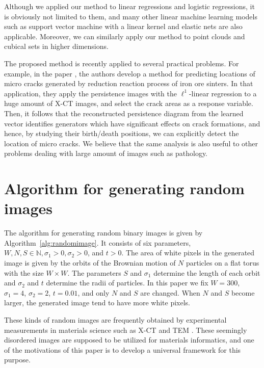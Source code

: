 \documentclass[smallextended]{svjour3}
\begin{document}
Although we applied our method to linear regressions and logistic regressions, it is obviously not limited to them, and many other linear machine learning models such as support vector machine with a linear kernel and elastic nets are also applicable. Moreover, we can similarly apply our method to point clouds and cubical sets in higher dimensions. 




The proposed method is recently applied to several practical problems. For example, in the paper \citep{iron}, the authors develop  a method for predicting locations of micro cracks generated by reduction reaction process of iron ore sinters. In that application, they apply the persistence images with the $\ell^1$-linear regression to a huge amount of X-CT images, and select the crack areas as a response variable. Then, it follows that the reconstructed persistence diagram from the learned vector identifies  generators which have significant effects on crack formations, and hence, by studying their birth/death positions, we can explicitly detect the location of micro cracks. We believe that the same analysis is also useful to other problems dealing with large amount of images such as pathology. 









\appendix


\section{Algorithm for generating random images}
\label{sec:randomimage}

The algorithm for generating random binary images is given 
by Algorithm~\ref{alg:randomimage}. It consists of six parameters, $W, N, S\in \mathbb{N}, \sigma_1 > 0, \sigma_2 > 0$, and $t >0$.
The area of white pixels in the generated image
is given by the orbits of the Brownian motion of $N$ particles on a flat torus with the size $W \times W$. The parameters $S$ and $\sigma_1$ determine the length of each orbit and $\sigma_2$ and $t$ determine the radii of particles. In this paper we fix $W=300$, $\sigma_1 = 4$, $\sigma_2 = 2$, $t = 0.01$, and only $N$ and $S$ are changed. When $N$ and $S$ become larger, the generated image tend to have more white pixels. 

These kinds of random images are frequently obtained by experimental measurements in materials science such as X-CT and TEM \citep{iron}. These seemingly disordered images are supposed to be utilized for materials informatics, and one of the motivations of this paper is to develop a universal framework for this purpose. 
\end{document}
